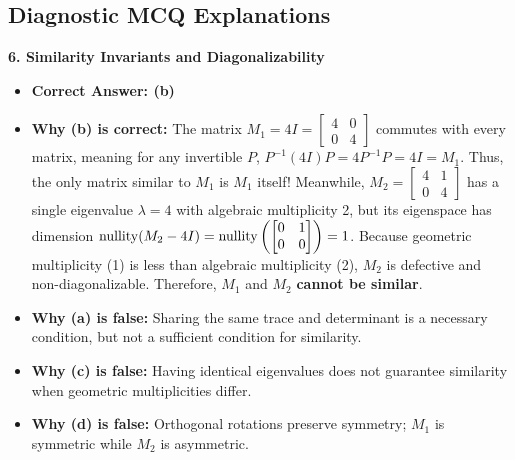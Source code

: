 \subsection*{Diagnostic MCQ Explanations}

\textbf{6. Similarity Invariants and Diagonalizability}
\begin{itemize}
    \item \textbf{Correct Answer: (b)}
    \item \textbf{Why (b) is correct:} The matrix $M_1 = 4I = \begin{bmatrix} 4 & 0 \\ 0 & 4 \end{bmatrix}$ commutes with every matrix, meaning for any invertible $P$, $P^{-1}(4I)P = 4 P^{-1} P = 4I = M_1$. Thus, the only matrix similar to $M_1$ is $M_1$ itself! Meanwhile, $M_2 = \begin{bmatrix} 4 & 1 \\ 0 & 4 \end{bmatrix}$ has a single eigenvalue $\lambda = 4$ with algebraic multiplicity 2, but its eigenspace has dimension $\operatorname{nullity}(M_2 - 4I) = \operatorname{nullity}\left(\begin{bmatrix} 0 & 1 \\ 0 & 0 \end{bmatrix}\right) = 1$. Because geometric multiplicity (1) is less than algebraic multiplicity (2), $M_2$ is defective and non-diagonalizable. Therefore, $M_1$ and $M_2$ \textbf{cannot be similar}.
    \item \textbf{Why (a) is false:} Sharing the same trace and determinant is a necessary condition, but not a sufficient condition for similarity.
    \item \textbf{Why (c) is false:} Having identical eigenvalues does not guarantee similarity when geometric multiplicities differ.
    \item \textbf{Why (d) is false:} Orthogonal rotations preserve symmetry; $M_1$ is symmetric while $M_2$ is asymmetric.
\end{itemize}

